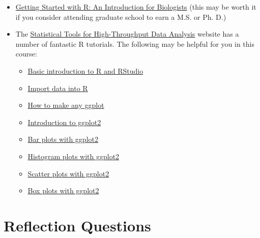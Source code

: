 \documentclass[
]{book}
\begin{document}
\begin{itemize}
\item
  \href{https://www.oxfordscholarship.com/view/10.1093/acprof:oso/9780199601615.001.0001/acprof-9780199601615}{Getting Started with R: An Introduction for Biologists} (this may be worth it if you consider attending graduate school to earn a M.S. or Ph. D.)
\item
  The \href{http://www.sthda.com/english/}{Statistical Tools for High-Throughput Data Analysis} website has a number of fantastic R tutorials. The following may be helpful for you in this course:

  \begin{itemize}
  \item
    \href{http://www.sthda.com/english/wiki/r-basics-quick-and-easy}{Basic introduction to R and RStudio}
  \item
    \href{http://www.sthda.com/english/wiki/importing-data-into-r}{Import data into R}
  \item
    \href{http://r-statistics.co/ggplot2-Tutorial-With-R.html}{How to make any ggplot}
  \item
    \href{http://www.sthda.com/english/wiki/ggplot2-essentials}{Introduction to ggplot2}
  \item
    \href{http://www.sthda.com/english/wiki/ggplot2-barplots-quick-start-guide-r-software-and-data-visualization}{Bar plots with ggplot2}
  \item
    \href{http://www.sthda.com/english/wiki/ggplot2-histogram-plot-quick-start-guide-r-software-and-data-visualization}{Histogram plots with ggplot2}
  \item
    \href{http://www.sthda.com/english/wiki/ggplot2-scatter-plots-quick-start-guide-r-software-and-data-visualization}{Scatter plots with ggplot2}
  \item
    \href{http://www.sthda.com/english/wiki/ggplot2-box-plot-quick-start-guide-r-software-and-data-visualization}{Box plots with ggplot2}
  \end{itemize}
\end{itemize}

\hypertarget{reflection-questions}{%
\section{Reflection Questions}\label{reflection-questions}}
\end{document}
